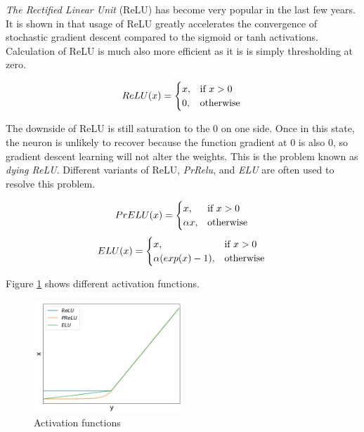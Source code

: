 \documentclass[times, utf8, diplomski, numeric, english]{fer}
\begin{document}
\textit{The Rectified Linear Unit }(ReLU) has become very popular in the last few years. It is shown in \cite{NIPS2012_4824} that usage of ReLU greatly accelerates the convergence of stochastic gradient descent compared to the sigmoid or tanh activations. Calculation of ReLU is much also more efficient as it is is simply thresholding at zero. 

\begin{equation}
ReLU(x) =
\begin{cases}
x, & \text{if}\ x>0 \\
0, & \text{otherwise}
\end{cases} \\
\end{equation}


The downside of ReLU is still saturation to the 0 on one side. Once in this state, the neuron is unlikely to recover because the function gradient at 0 is also 0, so gradient descent learning will not alter the weights. This is the problem known as \textit{dying ReLU}.
Different variants of ReLU, \textit{PrRelu}, and \textit{ELU} are often used to resolve this problem\cite{prelu}\cite{elu}.  

\begin{equation}    
PrELU(x)=
\begin{cases}
x, & \text{if}\ x>0 \\
\alpha x, & \text{otherwise}
\end{cases}\\
\end{equation}
\begin{equation}
ELU(x)=
\begin{cases}
x, & \text{if}\ x>0 \\
\alpha (exp(x) - 1), & \text{otherwise}
\end{cases}    \\
\end{equation}

Figure \ref{fg:activations} shows different activation functions.
\begin{figure}[!htb]
	\begin{center}
		\includegraphics[width=0.5\textwidth]{./imgs/activations.png}
		\caption{Activation functions}
		\label{fg:activations}
	\end{center}
\end{figure}
\end{document}
